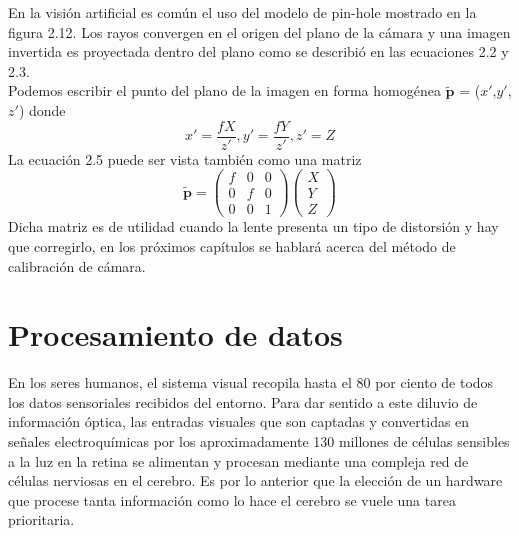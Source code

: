 En la visión artificial es común el uso del modelo de pin-hole mostrado en la figura 2.12. Los rayos convergen en el origen
del plano de la cámara y una imagen invertida es proyectada dentro del plano como se describió en las ecuaciones 2.2 y 2.3.\\
Podemos escribir el punto del plano de la imagen en forma homogénea $\tilde{\textbf{p}}$ = ($x'$,$y'$,$z'$) donde
\begin{equation}
	x' = \frac{fX}{z'}, y' = \frac{fY}{z'}, z' = Z
\end{equation}
La ecuación 2.5 puede ser vista también como una matriz
\begin{equation}
	\tilde{\textbf{p}} = \left(
	\begin{array}{ccc}
			f & 0 & 0 \\
			0 & f & 0 \\
			0 & 0 & 1
		\end{array}
	\right)
	\left(
	\begin{array}{c}
			X \\
			Y \\
			Z
		\end{array}
	\right)
\end{equation}
Dicha matriz es de utilidad cuando la lente presenta un tipo de distorsión y hay que corregirlo, en los próximos capítulos se
hablará acerca del método de calibración de cámara.



\section{Procesamiento de datos}
En los seres humanos, el sistema visual recopila hasta el 80 por ciento de todos los datos sensoriales recibidos del entorno.
Para dar sentido a este diluvio de información óptica, las entradas visuales que son captadas y convertidas en señales
electroquímicas por los aproximadamente 130 millones de células sensibles a la luz en la retina se alimentan y procesan mediante
una compleja red de células nerviosas en el cerebro.\cite{WEB:Cerebro}
Es por lo anterior que la elección de un hardware que procese tanta información como lo hace el cerebro se vuele una tarea
prioritaria.

